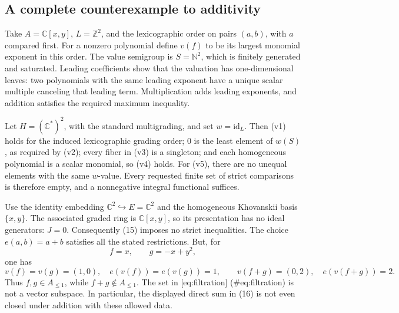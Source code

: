 \documentclass[10pt]{article}
\begin{document}
\subsection*{A complete counterexample to additivity}
Take \(A=\mathbb C[x,y]\), \(L=\mathbb Z^2\), and the lexicographic order on pairs \((a,b)\), with \(a\) compared first. For a nonzero polynomial define \(v(f)\) to be its largest monomial exponent in this order. The value semigroup is \(S=\mathbb N^2\), which is finitely generated and saturated. Leading coefficients show that the valuation has one-dimensional leaves: two polynomials with the same leading exponent have a unique scalar multiple canceling that leading term. Multiplication adds leading exponents, and addition satisfies the required maximum inequality.\par
Let \(H=(\mathbb C^*)^2\), with the standard multigrading, and set \(w=\mathrm{id}_L\). Then (v1) holds for the induced lexicographic grading order; \(0\) is the least element of \(w(S)\), as required by (v2); every fiber in (v3) is a singleton; and each homogeneous polynomial is a scalar monomial, so (v4) holds. For (v5), there are no unequal elements with the same \(w\)-value. Every requested finite set of strict comparisons is therefore empty, and a nonnegative integral functional suffices.\par
Use the identity embedding \(\mathbb C^2\hookrightarrow E=\mathbb C^2\) and the homogeneous Khovanskii basis \(\{x,y\}\). The associated graded ring is \(\mathbb C[x,y]\), so its presentation has no ideal generators: \(J=0\). Consequently (15) imposes no strict inequalities. The choice \(e(a,b)=a+b\) satisfies all the stated restrictions. But, for \[f=x,\qquad g=-x+y^2,\] one has \[v(f)=v(g)=(1,0),\quad e(v(f))=e(v(g))=1,
 \qquad v(f+g)=(0,2),\quad e(v(f+g))=2.\] Thus \(f,g\in A_{\leq1}\), while \(f+g\notin A_{\leq1}\). The set in [eq:filtration] (\#eq:filtration) is not a vector subspace. In particular, the displayed direct sum in (16) is not even closed under addition with these allowed data.\par
\end{document}
